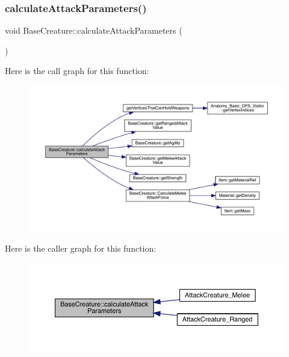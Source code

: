 \mbox{\label{class_base_creature_a389d8ae4c4caa2d7c55939bef70935a8}} 
\subsubsection{\texorpdfstring{calculate\+Attack\+Parameters()}{calculateAttackParameters()}}
{\footnotesize\ttfamily void Base\+Creature\+::calculate\+Attack\+Parameters (\begin{DoxyParamCaption}{ }\end{DoxyParamCaption})}

Here is the call graph for this function\+:
\nopagebreak
\begin{figure}[H]
\begin{center}
\leavevmode
\includegraphics[width=350pt]{d2/d3b/class_base_creature_a389d8ae4c4caa2d7c55939bef70935a8_cgraph}
\end{center}
\end{figure}
Here is the caller graph for this function\+:
\nopagebreak
\begin{figure}[H]
\begin{center}
\leavevmode
\includegraphics[width=350pt]{d2/d3b/class_base_creature_a389d8ae4c4caa2d7c55939bef70935a8_icgraph}
\end{center}
\end{figure}
\mbox{\label{class_base_creature_ac81e681e444ed860c212463025d04a1d}} 
